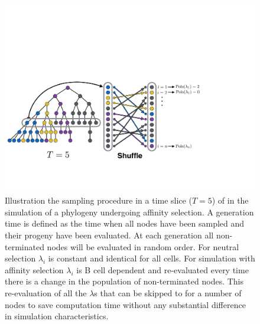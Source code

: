 \begin{figure}
    \centering
    \includegraphics[width=1\textwidth]{figures/tree_iteration.pdf}
    \caption{
        \label{fig:tree_iteration}
        Illustration the sampling procedure in a time slice ($T=5$) of in the simulation of a phylogeny undergoing affinity selection.
        A generation time is defined as the time when all nodes have been sampled and their progeny have been evaluated.
        At each generation all non-terminated nodes will be evaluated in random order.
        For neutral selection $\lambda_i$ is constant and identical for all cells.
        For simulation with affinity selection $\lambda_i$ is B cell dependent and re-evaluated every time there is a change in the population of non-terminated nodes.
        This re-evaluation of all the $\lambda$s that can be skipped to for a number of nodes to save computation time without any substantial difference in simulation characteristics.
    }
\end{figure}


